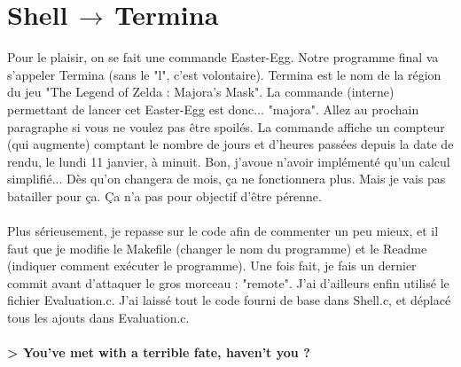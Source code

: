 \chapter[Termina]{Shell$\,\to\,$Termina}
Pour le plaisir, on se fait une commande Easter-Egg. Notre programme final va s'appeler Termina (sans le "l", c'est volontaire). Termina est le nom de la région du jeu "The Legend of Zelda : Majora's Mask". La commande (interne) permettant de lancer cet Easter-Egg est donc... "majora". Allez au prochain paragraphe si vous ne voulez pas être spoilés. La commande affiche un compteur (qui augmente) comptant le nombre de jours et d'heures passées depuis la date de rendu, le lundi 11 janvier, à minuit. Bon, j'avoue n'avoir implémenté qu'un calcul simplifié... Dès qu'on changera de mois, ça ne fonctionnera plus. Mais je vais pas batailler pour ça. Ça n'a pas pour objectif d'être pérenne.
\\\\
Plus sérieusement, je repasse sur le code afin de commenter un peu mieux, et il faut que je modifie le Makefile (changer le nom du programme) et le Readme (indiquer comment exécuter le programme). Une fois fait, je fais un dernier commit avant d'attaquer le gros morceau : "remote". J'ai d'ailleurs enfin utilisé le fichier Evaluation.c. J'ai laissé tout le code fourni de base dans Shell.c, et déplacé tous les ajouts dans Evaluation.c.
\\\\
\textbf{> You've met with a terrible fate, haven't you ?}